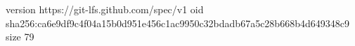 version https://git-lfs.github.com/spec/v1
oid sha256:ca6e9df9c4f04a15b0d951e456c1ac9950c32bdadb67a5c28b668b4d649348c9
size 79
